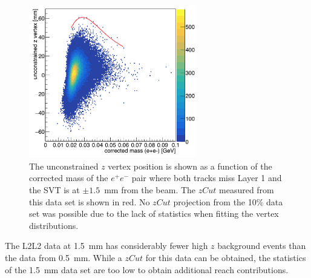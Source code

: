 \begin{figure}[htb]
  \centering
      \includegraphics[width=0.65\textwidth]{pics/appendix/zVm_1p5_L2L2.png}
  \caption[$z$ vertex and mass distribution for the L2L2 data set with the SVT at $\pm1.5$~mm]{The unconstrained $z$ vertex position is shown as a function of the corrected mass of the $e^+e^-$ pair where both tracks miss Layer 1 and the SVT is at $\pm1.5$~mm from the beam. The $zCut$ measured from this data set is shown in red. No $zCut$ projection from the 10$\%$ data set was possible due to the lack of statistics when fitting the vertex distributions.}
  \label{fig:zvm_l2l2_1p5}
\end{figure}
The L2L2 data at 1.5~mm has considerably fewer high $z$ background events than the data from 0.5~mm. While a $zCut$ for this data can be obtained, the statistics of the 1.5~mm data set are too low to obtain additional reach contributions. 